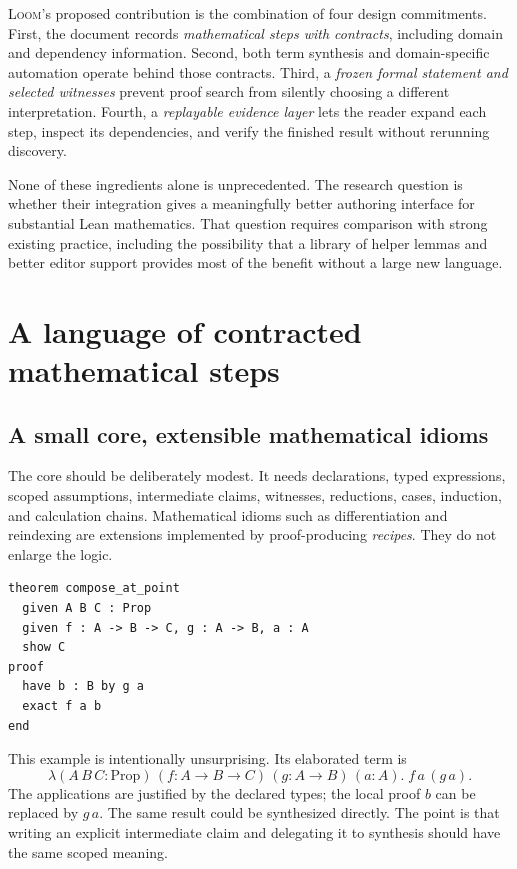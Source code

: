 \documentclass[11pt,letterpaper]{article}
\newcommand{\Loom}{\textsc{Loom}}
\theoremstyle{remark}
\begin{document}
\Loom's proposed contribution is the combination of four design commitments. First, the document records \emph{mathematical steps with contracts}, including domain and dependency information. Second, both term synthesis and domain-specific automation operate behind those contracts. Third, a \emph{frozen formal statement and selected witnesses} prevent proof search from silently choosing a different interpretation. Fourth, a \emph{replayable evidence layer} lets the reader expand each step, inspect its dependencies, and verify the finished result without rerunning discovery.

None of these ingredients alone is unprecedented. The research question is whether their integration gives a meaningfully better authoring interface for substantial Lean mathematics. That question requires comparison with strong existing practice, including the possibility that a library of helper lemmas and better editor support provides most of the benefit without a large new language.

\section{A language of contracted mathematical steps}
\label{sec:design}

\subsection{A small core, extensible mathematical idioms}

The core should be deliberately modest. It needs declarations, typed expressions, scoped assumptions, intermediate claims, witnesses, reductions, cases, induction, and calculation chains. Mathematical idioms such as differentiation and reindexing are extensions implemented by proof-producing \emph{recipes}. They do not enlarge the logic.

\par\noindent\begin{minipage}{\linewidth}
\begin{lstlisting}[caption={Proposed core surface; expressions use Lean-style typed notation.}]
theorem compose_at_point
  given A B C : Prop
  given f : A -> B -> C, g : A -> B, a : A
  show C
proof
  have b : B by g a
  exact f a b
end
\end{lstlisting}
\end{minipage}\par
This example is intentionally unsurprising. Its elaborated term is
\[
  \lambda (A\,B\,C:\mathrm{Prop})\,(f:A\to B\to C)\,
    (g:A\to B)\,(a:A).\;f\,a\,(g\,a).
\]
The applications are justified by the declared types; the local proof $b$ can be replaced by $g\,a$. The same result could be synthesized directly. The point is that writing an explicit intermediate claim and delegating it to synthesis should have the same scoped meaning.
\end{document}

